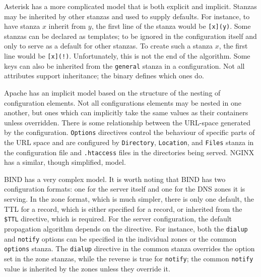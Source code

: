 \documentclass[letterpaper,twocolumn,10pt]{article}
\begin{document}
Asterisk has a more complicated model that is both explicit and implicit. Stanzas may be inherited by other stanzas and used to supply defaults. For instance, to have stanza $x$ inherit from $y$, the first line of the stanza would be \verb![x](y)!. Some stanzas can be declared as templates; to be ignored in the configuration itself and only to serve as a default for other stanzas. To create such a stanza $x$, the first line would be \verb#[x](!)#. Unfortunately, this is not the end of the algorithm. Some keys can also be inherited from the \texttt{general} stanza in a configuration. Not all attributes support inheritance; the binary defines which ones do.

Apache has an implicit model based on the structure of the nesting of configuration elements. Not all configurations elements may be nested in one another, but ones which can implicitly take the same values as their containers unless overridden. There is some relationship between the URL-space generated by the configuration. \texttt{Options} directives control the behaviour of specific parts of the URL space and are configured by \texttt{Directory}, \texttt{Location}, and \texttt{Files} stanza in the configuration file and \verb!.htaccess! files in the directories being served.\cite{apache} NGINX has a similar, though simplified, model.\cite{nginx}

BIND has a very complex model. It is worth noting that BIND has two configuration formats: one for the server itself and one for the DNS zones it is serving. In the zone format, which is much simpler, there is only one default, the TTL for a record, which is either specified for a record, or inherited from the \texttt{\$TTL} directive, which is required. For the server configuration, the default propagation algorithm depends on the directive. For instance, both the \texttt{dialup}  and \texttt{notify} options can be specified in the individual zones or the common \texttt{options} stanza. The \texttt{dialup} directive in the common stanza overrides the option set in the zone stanzas, while the reverse is true for \texttt{notify}; the common \texttt{notify} value is inherited by the zones unless they override it.\cite{bind}
\end{document}
